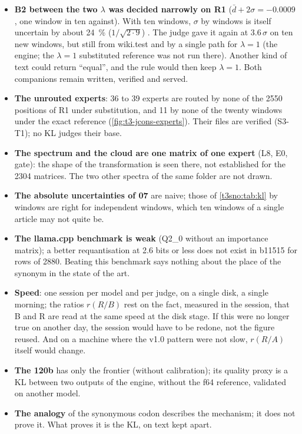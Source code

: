 \begin{faux}
\begin{itemize}
\item \textbf{B2 between the two $\lambda$ was decided narrowly on R1} ($\bar d + 2\sigma = -\num{0.0009}$, one window in ten against). With ten windows, $\sigma$ by windows is itself uncertain by about \SI{24}{\percent} ($1/\sqrt{2\cdot 9}$) \calc. The judge gave it again at \num{3.6}\,$\sigma$ on ten new windows, but still from wiki.test and by a single path for $\lambda = 1$ (the engine; the $\lambda = 1$ substituted reference was not run there). Another kind of text could return ``equal'', and the rule would then keep $\lambda = 1$. Both companions remain written, verified and served.
\item \textbf{The unrouted experts}: 36 to 39 experts are routed by none of the \num{2550} positions of R1 under substitution, and 11 by none of the twenty windows under the exact reference (\cref{fig:t3-jcons-experts}). Their files are verified (S3-T1); no KL judges their base.
\item \textbf{The spectrum and the cloud are one matrix of one expert} (L8, E0, gate): the shape of the transformation is seen there, not established for the \num{2304} matrices. The two other spectra of the same folder are not drawn.
\item \textbf{The absolute uncertainties of 07} are naive; those of \cref{t3sno:tab:kl} by windows are right for independent windows, which ten windows of a single article may not quite be.
\item \textbf{The llama.cpp benchmark is weak} (Q2\_0 without an importance matrix); a better requantisation at \num{2.6} bits or less does not exist in b11515 for rows of \num{2880}. Beating this benchmark says nothing about the place of the synonym in the state of the art.
\item \textbf{Speed}: one session per model and per judge, on a single disk, a single morning; the ratios $r(R/B)$ rest on the fact, measured in the session, that B and R are read at the same speed at the disk stage. If this were no longer true on another day, the session would have to be redone, not the figure reused. And on a machine where the v1.0 pattern were not slow, $r(R/A)$ itself would change.
\item \textbf{The 120b} has only the frontier (without calibration); its quality proxy is a KL between two outputs of the engine, without the f64 reference, validated on another model.
\item \textbf{The analogy} of the synonymous codon describes the mechanism; it does not prove it. What proves it is the KL, on text kept apart.
\end{itemize}
\end{faux}
